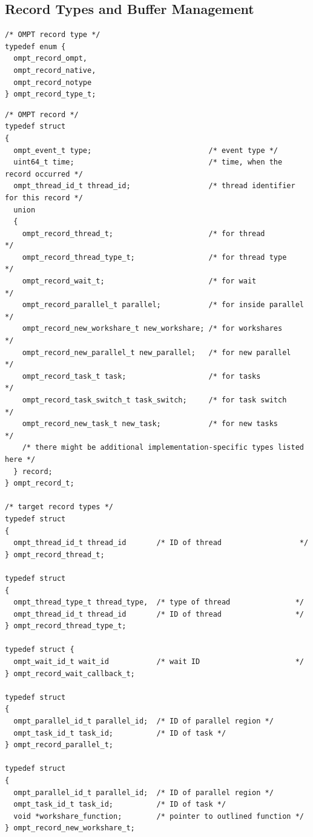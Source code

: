 \documentclass{article}
\begin{document}
{\clearpage  
\subsection{Record Types and Buffer Management}
\label{appendix:ompt-records}

\begin{verbatim}
/* OMPT record type */
typedef enum {
  ompt_record_ompt,
  ompt_record_native,
  ompt_record_notype
} ompt_record_type_t; 
\end{verbatim}

\begin{verbatim}
/* OMPT record */
typedef struct
{
  ompt_event_t type;                           /* event type */
  uint64_t time;                               /* time, when the record occurred */
  ompt_thread_id_t thread_id;                  /* thread identifier for this record */
  union
  {
    ompt_record_thread_t;                      /* for thread          */
    ompt_record_thread_type_t;                 /* for thread type     */
    ompt_record_wait_t;                        /* for wait            */
    ompt_record_parallel_t parallel;           /* for inside parallel */
    ompt_record_new_workshare_t new_workshare; /* for workshares      */
    ompt_record_new_parallel_t new_parallel;   /* for new parallel    */
    ompt_record_task_t task;                   /* for tasks           */
    ompt_record_task_switch_t task_switch;     /* for task switch     */
    ompt_record_new_task_t new_task;           /* for new tasks       */
    /* there might be additional implementation-specific types listed here */
  } record;
} ompt_record_t;

/* target record types */
typedef struct
{
  ompt_thread_id_t thread_id       /* ID of thread                  */
} ompt_record_thread_t;

typedef struct
{
  ompt_thread_type_t thread_type,  /* type of thread               */
  ompt_thread_id_t thread_id       /* ID of thread                 */
} ompt_record_thread_type_t;

typedef struct {
  ompt_wait_id_t wait_id           /* wait ID                      */
} ompt_record_wait_callback_t;

typedef struct
{
  ompt_parallel_id_t parallel_id;  /* ID of parallel region */
  ompt_task_id_t task_id;          /* ID of task */
} ompt_record_parallel_t;

typedef struct
{
  ompt_parallel_id_t parallel_id;  /* ID of parallel region */
  ompt_task_id_t task_id;          /* ID of task */
  void *workshare_function;        /* pointer to outlined function */
} ompt_record_new_workshare_t;


\end{verbatim}}
\end{document}
